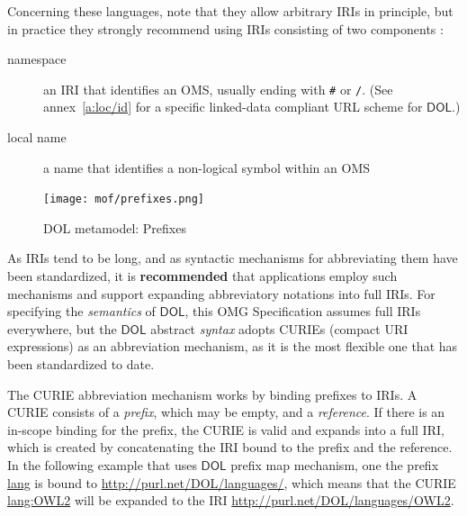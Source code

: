 \documentclass[10pt, a4paper]{isov2}
\newcommand*{\syntax}[1]{\texttt{#1}}
\newcommand*{\recommended}{\textbf{recommended}\xspace}
\newcommand*{\IS}{OMG Specification\xspace}
\newcommand*{\DOL}{\ensuremath{\mathsf{DOL}}\xspace}
\begin{document}
Concerning these languages, note that they allow arbitrary IRIs in principle, but in practice they 
strongly recommend using IRIs consisting of two components \cite{W3C:NOTE-swbp-vocab-pub-20080828}:
\begin{description}
\item[namespace] an IRI that identifies an OMS,
usually ending with \syntax{\#} or \syntax{/}. ({See annex~\ref{a:loc/id} for a specific linked-data compliant URL scheme for \DOL.})
\item[local name] a name that identifies a non-logical symbol within an OMS
\end{description}

\medskip
\begin{figure}
  \centering
    \texttt{[image: mof/prefixes.png]}
  \caption{DOL metamodel: Prefixes}
  \label{fig:prefixes}
\end{figure}


\label{c:curies}

As IRIs tend to be long, and as syntactic mechanisms for abbreviating them have been standardized, 
it is \recommended that applications employ such mechanisms and support expanding abbreviatory
notations into full IRIs.  For specifying the \emph{semantics} of \DOL, this \IS assumes full IRIs 
everywhere, but the \DOL abstract \emph{syntax} adopts CURIEs (compact URI expressions) as an 
abbreviation mechanism, as it is the most flexible one that has been standardized to date.  

The CURIE abbreviation mechanism works by binding prefixes to IRIs.  A CURIE consists of a 
\emph{prefix}, which may be empty, and a \emph{reference}.  If there is an in-scope binding for the 
prefix, the CURIE is valid and expands into a full IRI, which is created by concatenating the IRI 
bound to the prefix and the reference.  In the following example that uses \DOL prefix map mechanism, one the prefix \url{lang} is bound to \url{http://purl.net/DOL/languages/}, which
means that the CURIE \url{lang:OWL2} will be expanded to the IRI
\url{http://purl.net/DOL/languages/OWL2}.
\end{document}
